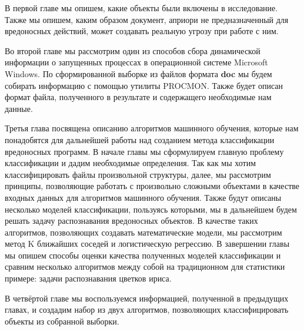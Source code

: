 В первой главе мы опишем, какие объекты были включены в исследование.
Также мы опишем, каким образом документ, априори не предназначенный для вредоносных действий, может создавать реальную угрозу при работе с ним.

Во второй главе мы рассмотрим один из способов сбора динамической информации о запущенных процессах в операционной системе Microsoft Windows. 
По сформированной выборке из файлов формата \textbf{doc} мы будем собирать информацию с помощью утилиты PROCMON.
Также будет описан формат файла, полученного в результате и содержащего необходимые нам данные.

Третья глава посвящена описанию алгоритмов машинного обучения, которые нам понадобятся для дальнейшей работы над созданием метода классификации вредоносных программ.
В начале главы мы сформулируем главную проблему классификации и дадим необходимые определения.
Так как мы хотим классифицировать файлы произвольной структуры, далее, мы рассмотрим принципы, позволяющие работать с произвольно сложными объектами в качестве входных данных для алгоритмов машинного обучения.
Также будут описаны несколько моделей классификации, пользуясь которыми, мы в дальнейшем будем решать задачу распознавания вредоносных объектов.
В качестве таких алгоритмов, позволяющих создавать математические модели, мы рассмотрим метод K ближайших соседей и логистическую регрессию.
В завершении главы мы опишем способы оценки качества полученных моделей классификации и сравним несколько алгоритмов между собой на традиционном для статистики примере: задачи распознавания цветков ириса.

В четвёртой главе мы воспользуемся информацией, полученной в предыдущих главах, и создадим набор из двух алгоритмов, позволяющих классифицировать объекты из собранной выборки.

